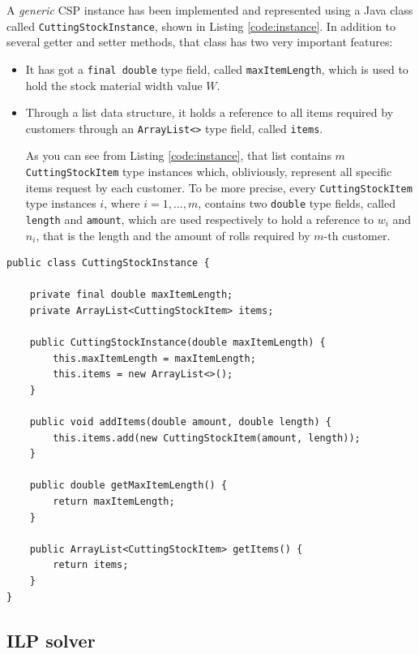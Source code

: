 \documentclass[10pt,a4paper]{article}
\begin{document}
A \textit{generic} CSP instance has been implemented and represented using a Java class called \texttt{CuttingStockInstance}, shown in Listing \ref{code:instance}. In addition to several getter and setter methods, that class has two very important features: 

\begin{itemize}
\item It has got a \texttt{final double} type field, called \texttt{maxItemLength}, which is used to hold the stock material width value $W$.

\item Through a list data structure, it holds a reference to all items required by customers through an \texttt{ArrayList<>} type field, called \texttt{items}. 

As you can see from Listing \ref{code:instance}, that list contains $m$ \texttt{CuttingStockItem} type instances which, obliviously, represent all specific items request by each customer. To be more precise, every \texttt{CuttingStockItem} type instances $i$, where $i = 1,...,m$, contains two \texttt{double} type fields, called \texttt{length} and \texttt{amount}, which are used respectively to hold a reference to $w_i$ and $n_i$, that is the length and the amount of rolls required by $m$-th customer. 
\end{itemize}

\begin{lstlisting}[frame=lines, caption={\texttt{CuttingStockInstance} class implementation.}, label={code:instance}]
public class CuttingStockInstance {

    private final double maxItemLength;
    private ArrayList<CuttingStockItem> items;

    public CuttingStockInstance(double maxItemLength) {
        this.maxItemLength = maxItemLength;
        this.items = new ArrayList<>();
    }

    public void addItems(double amount, double length) {
        this.items.add(new CuttingStockItem(amount, length));
    }

    public double getMaxItemLength() {
        return maxItemLength;
    }

    public ArrayList<CuttingStockItem> getItems() {
        return items;
    }
}
\end{lstlisting}

\subsection{ILP solver}
\end{document}

